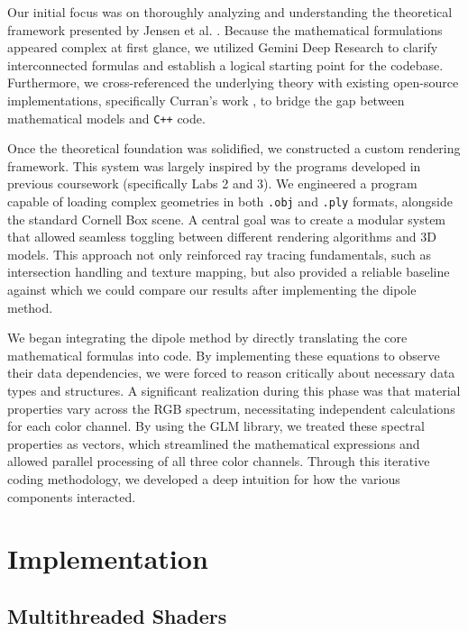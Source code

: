 \documentclass[sigconf,nonacm]{acmart}
\begin{document}
Our initial focus was on thoroughly analyzing and understanding the theoretical framework presented by Jensen et al. \cite{jensen2001practical}. Because the mathematical formulations appeared complex at first glance, we utilized Gemini Deep Research \cite{google2026gemini} to clarify interconnected formulas and establish a logical starting point for the codebase. Furthermore, we cross-referenced the underlying theory with existing open-source implementations, specifically Curran's work \cite{curranmax2013subsurface}, to bridge the gap between mathematical models and \texttt{C++} code.

Once the theoretical foundation was solidified, we constructed a custom rendering framework. This system was largely inspired by the programs developed in previous coursework (specifically Labs 2 and 3). We engineered a program capable of loading complex geometries in both \texttt{.obj} and \texttt{.ply} formats, alongside the standard Cornell Box scene. A central goal was to create a modular system that allowed seamless toggling between different rendering algorithms and 3D models. This approach not only reinforced ray tracing fundamentals, such as intersection handling and texture mapping, but also provided a reliable baseline against which we could compare our results after implementing the dipole method.

We began integrating the dipole method by directly translating the core mathematical formulas into code. By implementing these equations to observe their data dependencies, we were forced to reason critically about necessary data types and structures. A significant realization during this phase was that material properties vary across the RGB spectrum, necessitating independent calculations for each color channel. By using the GLM library, we treated these spectral properties as vectors, which streamlined the mathematical expressions and allowed parallel processing of all three color channels. Through this iterative coding methodology, we developed a deep intuition for how the various components interacted.

\section{Implementation}

\subsection{Multithreaded Shaders}
\end{document}

